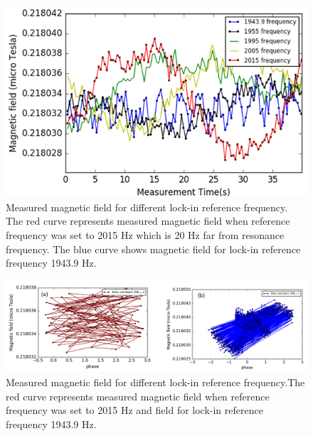 \documentclass[12pt]{report}
\begin{document}
\begin{figure}[h]
\centering\includegraphics[width=0.8\linewidth]{figures/reference_frequency}
\caption{Measured magnetic field for different lock-in reference frequency. The red curve represents measured magnetic field when reference frequency was set to 2015 Hz which is 20 Hz far from resonance frequency. The blue curve shows magnetic field for lock-in reference frequency 1943.9 Hz.}
\end{figure}
\begin{figure}[h]
\centering\includegraphics[width=0.8\linewidth]{figures/phase}
\caption{Measured magnetic field for different lock-in reference frequency.The red curve represents measured magnetic field when reference frequency was set to 2015 Hz and field for lock-in reference frequency 1943.9 Hz.}
\end{figure}
\newpage
\end{document}
